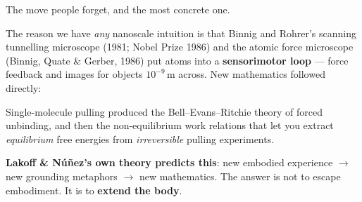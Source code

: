 \begin{movebox}[title={MOVE 4 --- Extend the literal body with instruments}]
The move people forget, and the most concrete one.

The reason we have \emph{any} nanoscale intuition is that Binnig and Rohrer's scanning tunnelling
microscope (1981; Nobel Prize 1986) and the atomic force microscope (Binnig, Quate \& Gerber, 1986)
put atoms into a \textbf{sensorimotor loop} --- force feedback and images for objects $10^{-9}$\,m
across. New mathematics followed directly:
\begin{center}
\end{center}
\vspace{-2pt}
Single-molecule pulling produced the Bell--Evans--Ritchie theory of forced unbinding, and then the
non-equilibrium work relations that let you extract \emph{equilibrium} free energies from
\emph{irreversible} pulling experiments.

\textbf{Lakoff \& Núñez's own theory predicts this}: new embodied experience $\to$ new grounding
metaphors $\to$ new mathematics. The answer is not to escape embodiment. It is to \textbf{extend the
body}.
\end{movebox}

